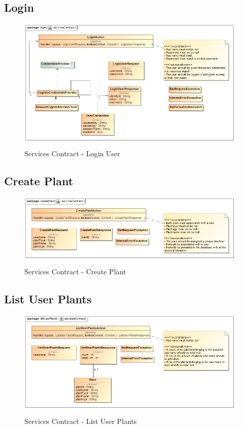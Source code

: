 \documentclass{article}
\begin{document}
	\subsection{Login}
		\begin{figure}[H]
			\includegraphics[width=\linewidth]{../images/ServicesContracts/login.jpg}
			\caption{Services Contract - Login User}
		\end{figure}
	
	\subsection{Create Plant}
		\begin{figure}[H]
			\includegraphics[width=\linewidth]{../images/ServicesContracts/createPlant.jpg}
			\caption{Services Contract - Create Plant}
		\end{figure}
		
	\subsection{List User Plants}
		\begin{figure}[H]
			\includegraphics[width=\linewidth]{../images/ServicesContracts/listUserPlants.jpg}
			\caption{Services Contract - List User Plants}
		\end{figure}
		
\end{document}
